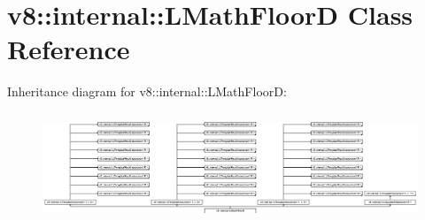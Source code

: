 \hypertarget{classv8_1_1internal_1_1_l_math_floor_d}{}\section{v8\+:\+:internal\+:\+:L\+Math\+FloorD Class Reference}
\label{classv8_1_1internal_1_1_l_math_floor_d}
Inheritance diagram for v8\+:\+:internal\+:\+:L\+Math\+FloorD\+:\begin{figure}[H]
\begin{center}
\leavevmode
\includegraphics[height=3.271375cm]{classv8_1_1internal_1_1_l_math_floor_d}
\end{center}
\end{figure}
